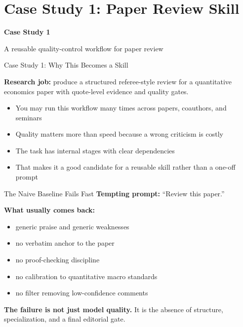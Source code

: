 \documentclass[10pt,english,aspectratio=169]{beamer}
\newcommand{\sectiondivider}[2]{%
\begin{frame}[plain,noframenumbering]
\begin{center}
\vfill
{\Large\textbf{#1}\par}
\vspace{0.35cm}
{\normalsize #2\par}
\vfill
\end{center}
\end{frame}
}
\begin{document}
\section{Case Study 1: Paper Review Skill}

\sectiondivider{Case Study 1}{A reusable quality-control workflow for paper review}

\begin{frame}{Case Study 1: Why This Becomes a Skill}
\begin{tcolorbox}[colback=blue!3, colframe=RedTitle!60]
\textbf{Research job:} produce a structured referee-style review for a quantitative economics paper with quote-level evidence and quality gates.
\end{tcolorbox}

\vspace{0.3cm}
\begin{itemize}
    \item You may run this workflow many times across papers, coauthors, and seminars
    \item Quality matters more than speed because a wrong criticism is costly
    \item The task has internal stages with clear dependencies
    \item That makes it a good candidate for a reusable skill rather than a one-off prompt
\end{itemize}
\end{frame}

\begin{frame}{The Naive Baseline Fails Fast}
\textbf{Tempting prompt:} ``Review this paper.''

\vspace{0.25cm}
\textbf{What usually comes back:}
\begin{itemize}
    \item generic praise and generic weaknesses
    \item no verbatim anchor to the paper
    \item no proof-checking discipline
    \item no calibration to quantitative macro standards
    \item no filter removing low-confidence comments
\end{itemize}

\vspace{0.3cm}
\textbf{The failure is not just model quality.} It is the absence of structure, specialization, and a final editorial gate.
\end{frame}
\end{document}
